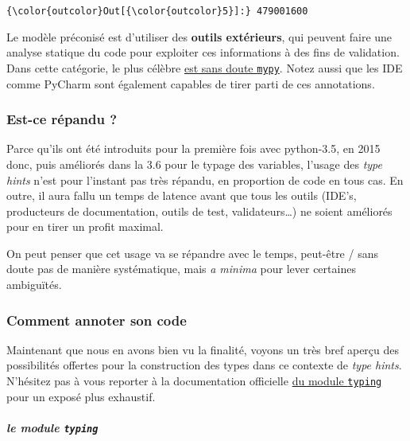 \begin{Verbatim}[commandchars=\\\{\},frame=single,framerule=0.3mm,rulecolor=\color{cellframecolor}]
{\color{outcolor}Out[{\color{outcolor}5}]:} 479001600
\end{Verbatim}
            
    Le modèle préconisé est d'utiliser des \textbf{outils extérieurs}, qui
peuvent faire une analyse statique du code pour exploiter ces
informations à des fins de validation. Dans cette catégorie, le plus
célèbre \href{http://mypy-lang.org/}{est sans doute \texttt{mypy}}.
Notez aussi que les IDE comme PyCharm sont également capables de tirer
parti de ces annotations.

    \hypertarget{est-ce-ruxe9pandu}{%
\subsubsection{Est-ce répandu ?}\label{est-ce-ruxe9pandu}}

    Parce qu'ils ont été introduits pour la première fois avec python-3.5,
en 2015 donc, puis améliorés dans la 3.6 pour le typage des variables,
l'usage des \emph{type hints} n'est pour l'instant pas très répandu, en
proportion de code en tous cas. En outre, il aura fallu un temps de
latence avant que tous les outils (IDE's, producteurs de documentation,
outils de test, validateurs\ldots{}) ne soient améliorés pour en tirer
un profit maximal.

On peut penser que cet usage va se répandre avec le temps, peut-être /
sans doute pas de manière systématique, mais \emph{a minima} pour lever
certaines ambiguïtés.

    \hypertarget{comment-annoter-son-code}{%
\subsubsection{Comment annoter son
code}\label{comment-annoter-son-code}}

    Maintenant que nous en avons bien vu la finalité, voyons un très bref
aperçu des possibilités offertes pour la construction des types dans ce
contexte de \emph{type hints}. N'hésitez pas à vous reporter à la
documentation officielle
\href{https://docs.python.org/3/library/typing.html}{du module
\texttt{typing}} pour un exposé plus exhaustif.

    \hypertarget{le-module-typing}{%
\subparagraph{\texorpdfstring{le module
\texttt{typing}}{le module typing}}\label{le-module-typing}}

